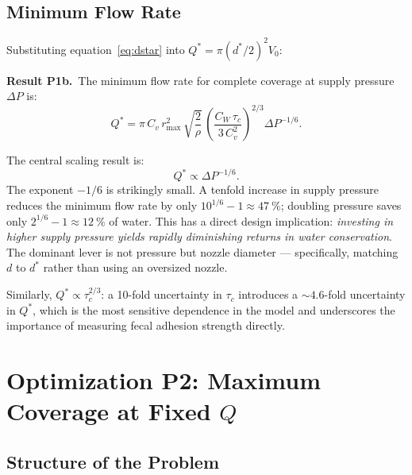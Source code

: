 \documentclass[aps,prfluids,reprint,amsmath,amssymb,floatfix]{revtex4-2}
\begin{document}
\subsection{Minimum Flow Rate}
\label{subsec:P1flow}

Substituting equation~\eqref{eq:dstar} into $Q^* = \pi(d^*/2)^2 V_0$:

\begin{mdframed}[style=resultbox]
\textbf{Result P1b.}\ The minimum flow rate for complete coverage at
supply pressure $\Delta P$ is:
\begin{equation}
  \boxed{Q^* = \pi\,C_v\,r_\mathrm{max}^2\,
  \sqrt{\frac{2}{\rho}}\,
  \left(\frac{C_W\,\tau_c}{3\,C_v^2}\right)^{2/3}
  \Delta P^{-1/6}.}
  \label{eq:Qstar}
\end{equation}
\end{mdframed}

The central scaling result is:
\begin{equation}
  Q^* \propto \Delta P^{-1/6}.
  \label{eq:Qscaling}
\end{equation}
The exponent $-1/6$ is strikingly small. A tenfold increase in supply
pressure reduces the minimum flow rate by only $10^{1/6} - 1 \approx
\SI{47}{\percent}$; doubling pressure saves only
$2^{1/6} - 1 \approx \SI{12}{\percent}$ of water.
This has a direct design implication: \emph{investing in higher supply
pressure yields rapidly diminishing returns in water conservation}.
The dominant lever is not pressure but nozzle diameter --- specifically,
matching $d$ to $d^*$ rather than using an oversized nozzle.

Similarly, $Q^* \propto \tau_c^{2/3}$: a 10-fold uncertainty in $\tau_c$
introduces a $\sim 4.6$-fold uncertainty in $Q^*$, which is the most
sensitive dependence in the model and underscores the importance of
measuring fecal adhesion strength directly.

\section{Optimization P2: Maximum Coverage at Fixed \texorpdfstring{$Q$}{Q}}
\label{sec:P2}

\subsection{Structure of the Problem}
\label{subsec:P2structure}
\end{document}
